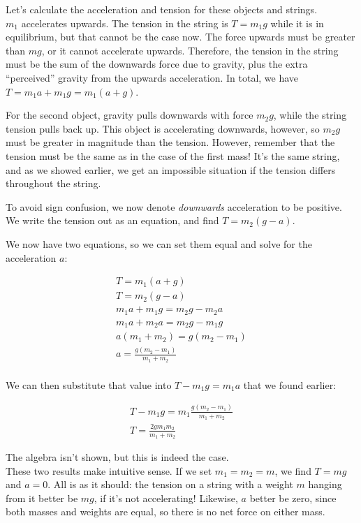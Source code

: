 \documentclass[12pt,a4paper]{report}
\begin{document}
Let's calculate the acceleration and tension for these objects and strings.\\
$m_1$ accelerates upwards. The tension in the string is $T = m_1 g$ while it is in equilibrium, but that cannot be the case now. The force upwards must be greater than $m g$, or it cannot accelerate upwards. Therefore, the tension in the string must be the sum of the downwards force due to gravity, plus the extra ``perceived'' gravity from the upwards acceleration. In total, we have $T = m_1 a + m_1 g = m_1(a + g)$.

For the second object, gravity pulls downwards with force $m_2 g$, while the string tension pulls back up. This object is accelerating downwards, however, so $m_2 g$ must be greater in magnitude than the tension. However, remember that the tension must be the same as in the case of the first mass! It's the same string, and as we showed earlier, we get an impossible situation if the tension differs throughout the string.

To avoid sign confusion, we now denote \emph{downwards} acceleration to be positive. We write the tension out as an equation, and find $T = m_2 (g - a)$.

We now have two equations, so we can set them equal and solve for the acceleration $a$:

\begin{align}
T = m_1(a + g)\\
T = m_2(g - a)\\
m_1 a + m_1 g = m_2 g - m_2 a\\
m_1 a + m_2 a = m_2 g - m_1 g\\
a(m_1 + m_2) = g(m_2 - m_1)\\
a = \frac{g(m_2 - m_1)}{m_1 + m_2}\\
\end{align}

We can then substitute that value into $T - m_1 g = m_1 a$ that we found earlier:

\begin{align}
T - m_1 g = m_1  \frac{g(m_2 - m_1)}{m_1 + m_2}\\
T = \frac{2 g m_1 m_2}{m_1 + m_2}
\end{align}

The algebra isn't shown, but this is indeed the case.\\
These two results make intuitive sense. If we set $m_1 = m_2 = m$, we find $T = m g$ and $a = 0$. All is as it should: the tension on a string with a weight $m$ hanging from it better be $m g$, if it's not accelerating! Likewise, $a$ better be zero, since both masses and weights are equal, so there is no net force on either mass.
\end{document}
